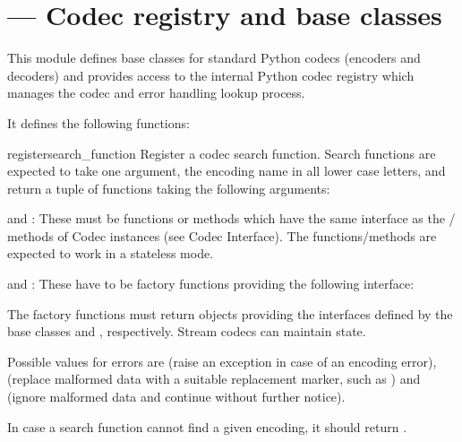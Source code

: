 \section{ ---
         Codec registry and base classes}





This module defines base classes for standard Python codecs (encoders
and decoders) and provides access to the internal Python codec
registry which manages the codec and error handling lookup process.

It defines the following functions:

\begin{funcdesc}{register}{search_function}
Register a codec search function. Search functions are expected to
take one argument, the encoding name in all lower case letters, and
return a tuple of functions  taking the following arguments:

   and : These must be functions or methods
  which have the same interface as the
  / methods of Codec instances (see
  Codec Interface). The functions/methods are expected to work in a
  stateless mode.

   and : These have to be
  factory functions providing the following interface:


  The factory functions must return objects providing the interfaces
  defined by the base classes  and
  , respectively. Stream codecs can maintain
  state.

  Possible values for errors are  (raise an exception
  in case of an encoding error),  (replace malformed
  data with a suitable replacement marker, such as ) and
   (ignore malformed data and continue without further
  notice).

In case a search function cannot find a given encoding, it should
return .
\end{funcdesc}

